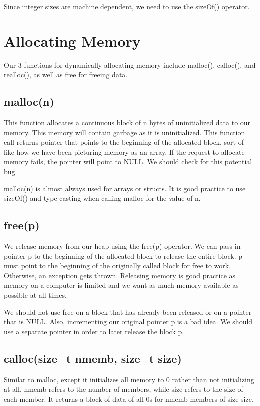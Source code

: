 \documentclass[letterpaper]{article}
\theoremstyle{remark}
\begin{document}
Since integer sizes are machine dependent, we need to use the sizeOf() operator.

\section{Allocating Memory}
Our 3 functions for dynamically allocating memory include malloc(), calloc(), and realloc(), as well as free for freeing data.

\subsection{malloc(n)}
This function allocates a continuous block of n bytes of uninitialized data to our memory. This memory will contain garbage as it is uninitialized. This function call returns pointer that points to the beginning of the allocated block, sort of like how we have been picturing memory as an array. If the request to allocate memory fails, the pointer will point to NULL. We should check for this potential bug.

malloc(n) is almost always used for arrays or structs. It is good practice to use sizeOf() and type casting when calling malloc for the value of n.

\subsection{free(p)}
We release memory from our heap using the free(p) operator. We can pass in pointer p to the beginning of the allocated block to release the entire block. p must point to the beginning of the originally called block for free to work. Otherwise, an exception gets thrown. Releasing memory is good practice as memory on a computer is limited and we want as much memory available as possible at all times.

We should not use free on a block that has already been released or on a pointer that is NULL. Also, incrementing our original pointer p is a bad idea. We should use a separate pointer in order to later release the block p.

\subsection{calloc(size_t nmemb, size_t size)}
Similar to malloc, except it initializes all memory to 0 rather than not initializing at all. nmemb refers to the number of members, while size refers to the size of each member. It returns a block of data of all 0s for nmemb members of size size.
\end{document}
